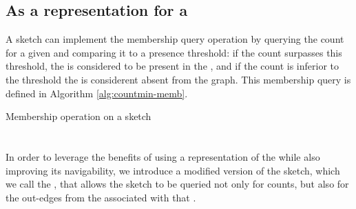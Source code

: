 \subsection{As a representation for a \dBG}


A \cm sketch can implement the membership query operation by querying the count for a given \kmer and comparing it to a presence threshold:
if the count surpasses this threshold, the \kmer is considered to be present in the \dBG, and if the count is inferior to the threshold the
\kmer is considerent absent from the graph. This membership query is defined in Algorithm \ref{alg:countmin-memb}.

\begin{algorithm}[htbp]
  \caption{Membership operation on a \cm sketch}\label{alg:countmin-memb}
\end{algorithm}

\section{\dBCM}
\label{sec:debruijncountmin}



In order to leverage the benefits of using a \cm representation of the \dBG while also improving its navigability, we introduce a modified
version of the \cm sketch, which we call the \dBCM, that allows the sketch to be queried not only for \kmer counts, but also for the
out-edges from the \dBG associated with that \kmer. 

